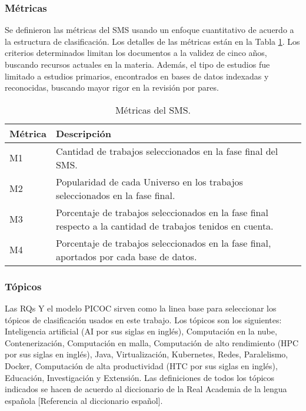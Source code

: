 \subsubsection{Métricas}
Se definieron las métricas del SMS usando un enfoque cuantitativo de acuerdo a la estructura de clasificación. Los detalles de las métricas están en la Tabla \ref{table:Metrics}. Los criterios determinados limitan los documentos a la validez de cinco años, buscando recursos actuales en la materia. Además, el tipo de estudios fue limitado a estudios primarios, encontrados en bases de datos indexadas y reconocidas, buscando mayor rigor en la revisión por pares.

\begin{table}[htbp]

	\centering
	\renewcommand{\arraystretch}{1.7}  %
	\setlength{\tabcolsep}{3pt}      %
	\vspace{10pt}                     %
	\begin{tabular}{|>{\arraybackslash}m{1cm}|>{\arraybackslash}m{7cm}|}
		\hline
		\textbf{Métrica} & \textbf{Descripción}                                                                                        \\
		\hline
		M1               & Cantidad de trabajos seleccionados en la fase final del SMS.                                                \\
		\hline
		M2               & Popularidad de cada Universo en los trabajos seleccionados en la fase final.                                \\
		\hline
		M3               & Porcentaje de trabajos seleccionados en la fase final respecto a la cantidad de trabajos tenidos en cuenta. \\
		\hline
		M4               & Porcentaje de trabajos seleccionados en la fase final, aportados por cada base de datos.                    \\
		\hline
	\end{tabular}
	\vspace{6pt}  %
	\caption{Métricas del SMS.}
	\label{table:Metrics}

\end{table}

\subsubsection{Tópicos}
Las RQs Y el modelo PICOC sirven como la linea base para seleccionar los tópicos de clasificación usados en este trabajo. Los tópicos son los siguientes: Inteligencia artificial (AI por sus siglas en inglés), Computación en la nube, Contenerización, Computación en malla, Computación de alto rendimiento (HPC por sus siglas en inglés), Java, Virtualización, Kubernetes, Redes, Paralelismo, Docker, Computación de alta productividad (HTC por sus siglas en inglés), Educación, Investigación y Extensión. Las definiciones de todos los tópicos indicados se hacen de acuerdo al diccionario de la Real Academia de la lengua española [Referencia al diccionario español].

